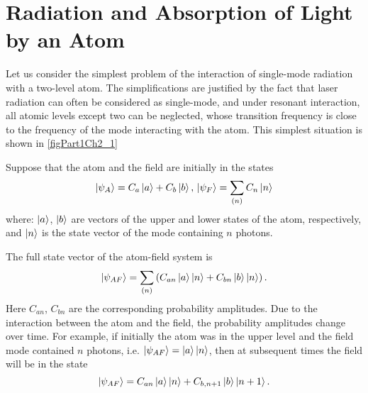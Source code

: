 \section{Radiation and Absorption of Light by an Atom}
Let us consider the simplest problem of the interaction of single-mode radiation with a two-level atom. The simplifications are justified by the fact that laser radiation can often be considered as single-mode, and under resonant interaction, all atomic levels except two can be neglected, whose transition frequency is close to the frequency of the mode interacting with the atom. This simplest situation is shown in \autoref{figPart1Ch2_1}



Suppose that the atom and the field are initially in the states
\begin{equation}
\left|\psi_A\right> = C_a\ket{a} + C_b\ket{b}, \,
\left|\psi_F\right> = \sum_{(n)}C_n\ket{n}
\end{equation}
where: $\ket{a}$, $\ket{b}$ are vectors of the upper and lower states of the atom, respectively, and $\ket{n}$ is the state vector of the mode containing $n$ photons.
  
The full state vector of the atom-field system is
\begin{equation}
\left|\psi_{AF}\right> = \sum_{(n)} 
\left(
C_{an}\ket{a}\ket{n} + 
C_{bn}\ket{b}\ket{n}
\right).
\end{equation}
Here $C_{an}$, $C_{bn}$ are the corresponding probability amplitudes. Due to the interaction between the atom and the field, the probability amplitudes change over time. For example, if initially the atom was in the upper level and the field mode contained $n$ photons, i.e.
$\left|\psi_{AF}\right> = \ket{a}\ket{n}$,
then at subsequent times the field will be in the state  
\begin{equation}
\left|\psi_{AF}\right> =
C_{an}\ket{a}\ket{n} + 
C_{b,n + 1}\ket{b}\ket{n + 1}.
\label{eq:part1:rabi_solution}
\end{equation}